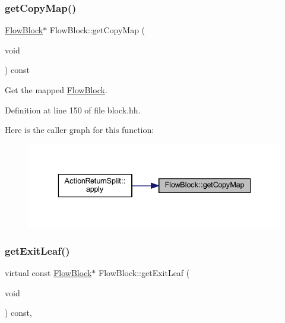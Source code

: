 \subsubsection{\texorpdfstring{getCopyMap()}{getCopyMap()}}
{\footnotesize\ttfamily \mbox{\hyperlink{class_flow_block}{Flow\+Block}}$\ast$ Flow\+Block\+::get\+Copy\+Map (\begin{DoxyParamCaption}\item[{void}]{ }\end{DoxyParamCaption}) const\hspace{0.3cm}{\ttfamily [inline]}}



Get the mapped \mbox{\hyperlink{class_flow_block}{Flow\+Block}}. 



Definition at line 150 of file block.\+hh.

Here is the caller graph for this function\+:
\nopagebreak
\begin{figure}[H]
\begin{center}
\leavevmode
\includegraphics[width=336pt]{class_flow_block_a40e35da1a06856a7f9a8af381c3e3261_icgraph}
\end{center}
\end{figure}
\mbox{\label{class_flow_block_a611bb926194635a0f5cfc0eb16cabe6a}} 
\subsubsection{\texorpdfstring{getExitLeaf()}{getExitLeaf()}}
{\footnotesize\ttfamily virtual const \mbox{\hyperlink{class_flow_block}{Flow\+Block}}$\ast$ Flow\+Block\+::get\+Exit\+Leaf (\begin{DoxyParamCaption}\item[{void}]{ }\end{DoxyParamCaption}) const\hspace{0.3cm}{\ttfamily [inline]}, {\ttfamily [virtual]}}



